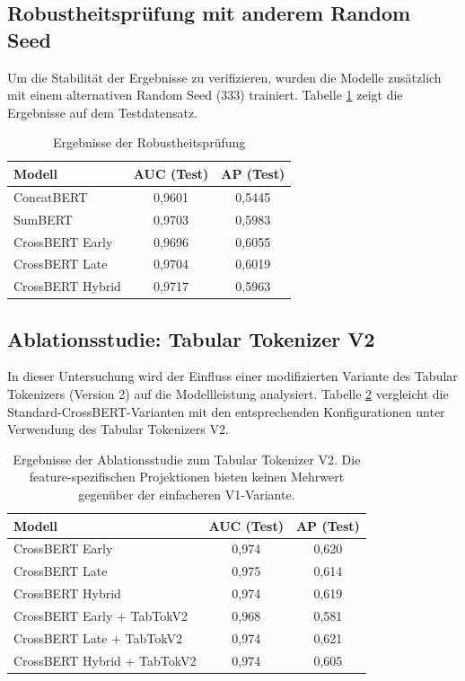 \subsection{Robustheitsprüfung mit anderem Random Seed}
\label{app:seed_333_evaluation}

Um die Stabilität der Ergebnisse zu verifizieren, wurden die Modelle zusätzlich mit einem alternativen Random Seed (333) trainiert. Tabelle \ref{tab:seed_333_results} zeigt die Ergebnisse auf dem Testdatensatz.

\begin{table}[h]
    \centering
    \caption{Ergebnisse der Robustheitsprüfung}
    \label{tab:seed_333_results}
    \begin{tabular}{lcc}
        \hline
        \textbf{Modell} & \textbf{AUC (Test)} & \textbf{AP (Test)} \\
        \hline
        ConcatBERT & 0{,}9601 & 0{,}5445 \\
        SumBERT & 0{,}9703 & 0{,}5983 \\
        CrossBERT Early & 0{,}9696 & 0{,}6055 \\
        CrossBERT Late & 0{,}9704 & 0{,}6019 \\
        CrossBERT Hybrid & 0{,}9717 & 0{,}5963 \\
        \hline
    \end{tabular}
\end{table}

\subsection{Ablationsstudie: Tabular Tokenizer V2}
\label{app:ablation_tokenizer_v2}

In dieser Untersuchung wird der Einfluss einer modifizierten Variante des Tabular Tokenizers (Version 2) auf die Modellleistung analysiert. Tabelle \ref{tab:ablation_tokenizer_v2} vergleicht die Standard-CrossBERT-Varianten mit den entsprechenden Konfigurationen unter Verwendung des Tabular Tokenizers V2.

\begin{table}[h]
    \centering
    \caption{Ergebnisse der Ablationsstudie zum Tabular Tokenizer V2. Die feature-spezifischen Projektionen bieten keinen Mehrwert gegenüber der einfacheren V1-Variante.}
    \label{tab:ablation_tokenizer_v2}
    \begin{tabular}{lcc}
        \hline
        \textbf{Modell} & \textbf{AUC (Test)} & \textbf{AP (Test)} \\
        \hline
        CrossBERT Early & 0{,}974 & 0{,}620 \\
        CrossBERT Late & 0{,}975 & 0{,}614 \\
        CrossBERT Hybrid & 0{,}974 & 0{,}619 \\
        \hline
        CrossBERT Early + TabTokV2 & 0{,}968 & 0{,}581 \\
        CrossBERT Late + TabTokV2 & 0{,}974 & 0{,}621 \\
        CrossBERT Hybrid + TabTokV2 & 0{,}974 & 0{,}605 \\
        \hline
    \end{tabular}
\end{table}

